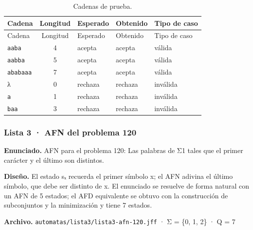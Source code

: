 \begin{longtable}[]{@{}lclll@{}}
\caption{Cadenas de prueba.}\tabularnewline
\toprule\noalign{}
Cadena & Longitud & Esperado & Obtenido & Tipo de caso \\
\midrule\noalign{}
\endfirsthead
\toprule\noalign{}
Cadena & Longitud & Esperado & Obtenido & Tipo de caso \\
\midrule\noalign{}
\endhead
\bottomrule\noalign{}
\endlastfoot
\texttt{aaba} & 4 & acepta & acepta & válida \\
\texttt{aabba} & 5 & acepta & acepta & válida \\
\texttt{ababaaa} & 7 & acepta & acepta & válida \\
λ & 0 & rechaza & rechaza & inválida \\
\texttt{a} & 1 & rechaza & rechaza & inválida \\
\texttt{baa} & 3 & rechaza & rechaza & inválida \\
\end{longtable}


\hypertarget{lista-3-afn-del-problema-120}{%
\subsubsection{Lista 3 · AFN del problema 120}\label{lista-3-afn-del-problema-120}}

\textbf{Enunciado.} AFN para el problema 120: Las palabras de Σ1 tales que el primer carácter y el último son distintos.

\textbf{Diseño.} El estado sₓ recuerda el primer símbolo x; el AFN adivina el último símbolo, que debe ser distinto de x. El enunciado se resuelve de forma natural con un AFN de 5 estados; el AFD equivalente se obtuvo con la construcción de subconjuntos y la minimización y tiene 7 estados.

\textbf{Archivo.} \texttt{automatas/lista3/lista3-afn-120.jff} · Σ = \{0, 1, 2\} · \textbar Q\textbar{} = 7

